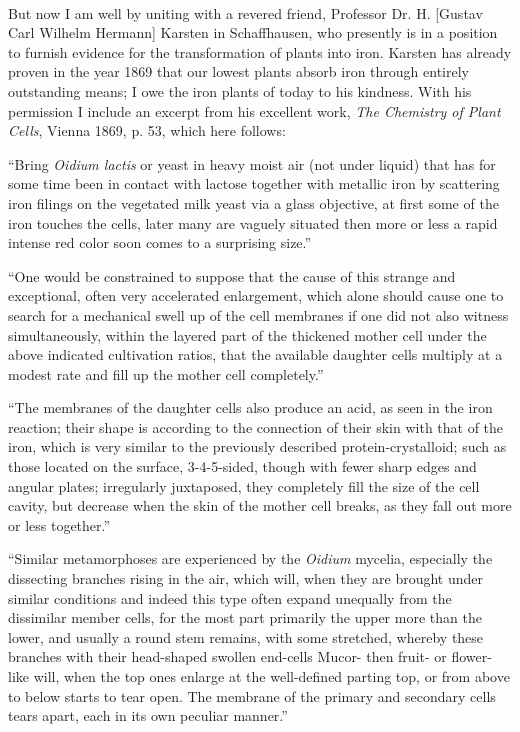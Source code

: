 \documentclass[a4paper, 12pt, oneside]{article}
\begin{document}
\paragraph*{}
But now I am well by uniting with a revered friend, Professor Dr. H. [Gustav Carl Wilhelm Hermann] Karsten in Schaffhausen, who presently is in a position to furnish evidence for the transformation of plants into iron. Karsten has already proven in the year 1869 that our lowest plants absorb iron through entirely outstanding means; I owe the iron plants of today to his kindness. With his permission I include an excerpt from his excellent work, \emph{The Chemistry of Plant Cells}, Vienna 1869, p. 53, which here follows:

``Bring \emph{Oidium lactis} or yeast in heavy moist air (not under liquid) that has for some time been in contact with lactose together with metallic iron by scattering iron filings on the vegetated milk yeast via a glass objective, at first some of the iron touches the cells, later many are vaguely situated then more or less a rapid intense red color soon comes to a surprising size.''

``One would be constrained to suppose that the cause of this strange and exceptional, often very accelerated enlargement, which alone should cause one to search for a mechanical swell up of the cell membranes if one did not also witness simultaneously, within the layered part of the thickened mother cell under the above indicated cultivation ratios, that the available daughter cells multiply at a modest rate and fill up the mother cell completely.''

``The membranes of the daughter cells also produce an acid, as seen in the iron reaction; their shape is according to the connection of their skin with that of the iron, which is very similar to the previously described protein-crystalloid; such as those located on the surface, 3-4-5-sided, though with fewer sharp edges and angular plates; irregularly juxtaposed, they completely fill the size of the cell cavity, but decrease when the skin of the mother cell breaks, as they fall out more or less together.''

``Similar metamorphoses are experienced by the \emph{Oidium} mycelia, especially the dissecting branches rising in the air, which will, when they are brought under similar conditions and indeed this type often expand unequally from the dissimilar member cells, for the most part primarily the upper more than the lower, and usually a round stem remains, with some stretched, whereby these branches with their head-shaped swollen end-cells Mucor- then fruit- or flower-like will, when the top ones enlarge at the well-defined parting top, or from above to below starts to tear open. The membrane of the primary and secondary cells tears apart, each in its own peculiar manner.''
\end{document}
